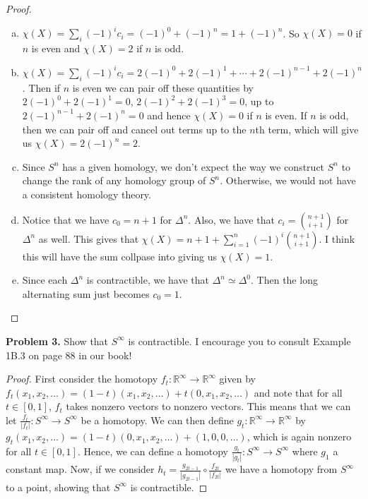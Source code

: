 \documentclass[leqno]{article}
\theoremstyle{nonumberplain}
\newtheorem{proof}{Proof}
\newcommand{\R}{\mathbb{R}}
\begin{document}
\begin{proof}~
\begin{enumerate}[(a)]
\item $\chi(X)=\sum_i (-1)^i c_i = (-1)^0+(-1)^n = 1 +(-1)^n$. So $\chi(X)=0$ if $n$ is even and $\chi(X)=2$ if $n$ is odd.
\item $\chi(X)=\sum_i (-1)^i c_i = 2(-1)^0 + 2(-1)^1 + \cdots + 2(-1)^{n-1}+2(-1)^n$.  Then if $n$ is even we can pair off these quantities by $2(-1)^0+2(-1)^1 = 0$, $2(-1)^2+2(-1)^3=0$, up to $2(-1)^{n-1}+2(-1)^n=0$ and hence $\chi(X)=0$ if $n$ is even.  If $n$ is odd, then we can pair off and cancel out terms up to the $n$th term, which will give us $\chi(X)=2(-1)^n=2$.
\item Since $S^n$ has a given homology, we don't expect the way we construct $S^n$ to change the rank of any homology group of $S^n$.  Otherwise, we would not have a consistent homology theory.
\item Notice that we have $c_0=n+1$ for $\Delta^n$.  Also, we have that $c_i = {{n+1}\choose{i+1}}$ for $\Delta^n$ as well.  This gives that $\chi(X)=n+1 + \sum_{i=1}^n (-1)^i{{n+1}\choose{i+1}}$. I think this will have the sum collpase into giving us $\chi(X)=1$.
\item Since each $\Delta^n$ is contractible, we have that $\Delta^n \simeq \Delta^0$.  Then the long alternating sum just becomes $c_0=1$.  
\end{enumerate}
\end{proof}

\vspace*{1cm}


\noindent\textbf{Problem 3.} Show that $S^\infty$ is contractible. I encourage you to consult Example 1B.3 on page 88 in our book! 

\begin{proof}
First consider the homotopy $f_t \colon \R^\infty \to \R^\infty$ given by $f_t(x_1,x_2,\dots)=(1-t)(x_1,x_2,\dots)+t(0,x_1,x_2,\dots)$ and note that for all $t\in [0,1]$, $f_t$ takes nonzero vectors to nonzero vectors.  This means that we can let $\frac{f_t}{|f_t|}\colon S^\infty \to S^\infty$ be a homotopy.  We can then define $g_t \colon \R^\infty \to \R^\infty$ by $g_t(x_1,x_2,\dots)=(1-t)(0,x_1,x_2,\dots)+(1,0,0,\dots)$, which is again nonzero for all $t\in [0,1]$.  Hence, we can define a homotopy $\frac{g_t}{|g_t|} \colon S^\infty \to S^\infty$ where $g_1$ a constant map.  Now, if we consider $h_t = \frac{g_{2t-1}}{|g_{2t-1}|} \circ \frac{f_{2t}}{|f_{2t}|}$ we have a homotopy from $S^\infty$ to a point, showing that $S^\infty$ is contractible.
\end{proof}
\end{document}
